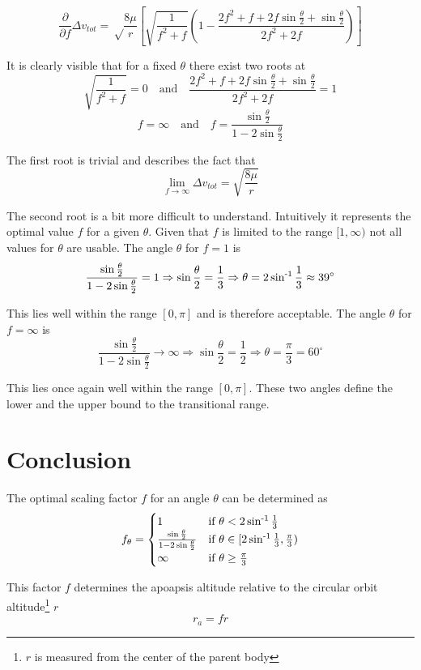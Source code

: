 \documentclass[a4paper, 11pt]{article}
\begin{document}
$$\frac{\partial}{\partial f}\Delta v_{tot}
= \sqrt\frac{8\mu}{r} \left[ \sqrt{\frac{1}{f^2+f}} \left(1- \frac{2f^2+f+2f\sin\frac\theta 2 + \sin\frac\theta 2}{2f^2+2f} \right)\right]
$$

It is clearly visible that for a fixed $\theta$ there exist two roots at
$$\sqrt{\frac{1}{f^2+f}} = 0 \quad\text{and}\quad  \frac{2f^2+f+2f\sin\frac\theta 2 + \sin\frac\theta 2}{2f^2+2f} =1$$
$$f = \infty \quad \text{and} \quad f = \frac{\sin\frac\theta 2}{1-2\sin\frac\theta 2}$$

The first root is trivial and describes the fact that
$$\lim_{f\to\infty}\Delta v_{tot} = \sqrt{\frac{8\mu}{r}}$$

The second root is a bit more difficult to understand. Intuitively it represents the optimal value $f$ for a given $\theta$.
Given that $f$ is limited to the range $[1,\infty)$ not all values for $\theta$ are usable.
The angle $\theta$ for $f=1$ is
$$\frac{\sin\frac\theta 2}{1-2\sin\frac\theta 2} = 1 \Rightarrow \sin\frac\theta 2 = \frac13 \Rightarrow \theta = 2\sin^{\text-1}\frac13 \approx 39^\circ$$

This lies well within the range $[0,\pi]$ and is therefore acceptable. The angle $\theta$ for $f=\infty$ is
$$\frac{\sin\frac\theta 2}{1-2\sin\frac\theta 2} \to \infty \Rightarrow \sin\frac\theta2 = \frac12 \Rightarrow \theta = \frac\pi3=60^\circ $$

This lies once again well within the range $[0,\pi]$. These two angles define the lower and the upper bound to the transitional range.

\section{Conclusion}
The optimal scaling factor $f$ for an angle $\theta$ can be determined as
$$
f_\theta = \begin{cases}
1 & \text{if } \theta < 2\sin^{\text-1}\frac13\\
\frac{\sin\frac\theta 2}{1-2\sin\frac\theta 2} & \text{if } \theta \in [2\sin^{\text-1}\frac13,\frac\pi3)\\
\infty & \text{if } \theta \geq \frac\pi3
\end{cases}$$

This factor $f$ determines the apoapsis altitude relative to the circular orbit altitude\footnote{$r$ is measured from the center of the parent body} $r$
$$r_a = fr$$
\end{document}
